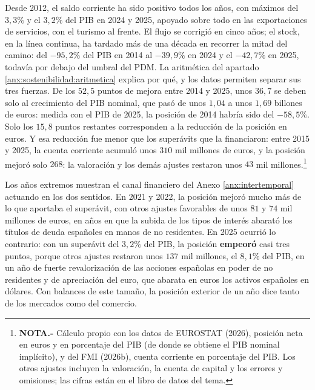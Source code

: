\documentclass[10pt,a4paper]{article}
\begin{document}
Desde 2012, el saldo corriente ha sido positivo todos los años, con máximos del $3{,}3\%$ y el $3{,}2\%$ del PIB en 2024 y 2025, apoyado sobre todo en las exportaciones de servicios, con el turismo al frente. El flujo se corrigió en cinco años; el stock, en la línea continua, ha tardado más de una década en recorrer la mitad del camino: del $-95{,}2\%$ del PIB en 2014 al $-39{,}9\%$ en 2024 y el $-42{,}7\%$ en 2025, todavía por debajo del umbral del PDM. La aritmética del apartado \ref{anx:sostenibilidad:aritmetica} explica por qué, y los datos permiten separar sus tres fuerzas. De los $52{,}5$ puntos de mejora entre 2014 y 2025, unos $36{,}7$ se deben solo al crecimiento del PIB nominal, que pasó de unos $1{,}04$ a unos $1{,}69$ billones de euros: medida con el PIB de 2025, la posición de 2014 habría sido del $-58{,}5\%$. Solo los $15{,}8$ puntos restantes corresponden a la reducción de la posición en euros. Y esa reducción fue menor que los superávits que la financiaron: entre 2015 y 2025, la cuenta corriente acumuló unos $310$ mil millones de euros, y la posición mejoró solo $268$: la valoración y los demás ajustes restaron unos $43$ mil millones.\footnote{%
    \textbf{NOTA.-} Cálculo propio con los datos de EUROSTAT (2026), posición neta en euros y en porcentaje del PIB (de donde se obtiene el PIB nominal implícito), y del FMI (2026b), cuenta corriente en porcentaje del PIB. Los otros ajustes incluyen la valoración, la cuenta de capital y los errores y omisiones; las cifras están en el libro de datos del tema.
}

Los años extremos muestran el canal financiero del Anexo \ref{anx:intertemporal} actuando en los dos sentidos. En 2021 y 2022, la posición mejoró mucho más de lo que aportaba el superávit, con otros ajustes favorables de unos $81$ y $74$ mil millones de euros, en años en que la subida de los tipos de interés abarató los títulos de deuda españoles en manos de no residentes. En 2025 ocurrió lo contrario: con un superávit del $3{,}2\%$ del PIB, la posición \textbf{empeoró} casi tres puntos, porque otros ajustes restaron unos $137$ mil millones, el $8{,}1\%$ del PIB, en un año de fuerte revalorización de las acciones españolas en poder de no residentes y de apreciación del euro, que abarata en euros los activos españoles en dólares. Con balances de este tamaño, la posición exterior de un año dice tanto de los mercados como del comercio.
\end{document}
